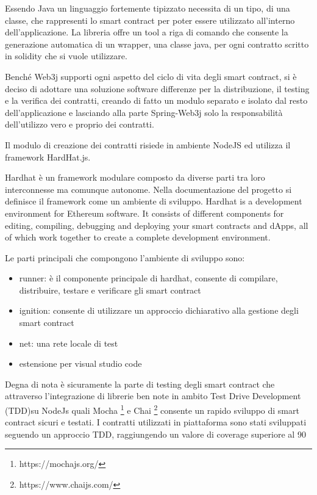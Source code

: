 \documentclass[a4paper,11pt]{article}
\begin{document}
Essendo Java un linguaggio fortemente tipizzato necessita di un tipo, di una classe, che rappresenti lo smart contract per poter essere utilizzato all'interno dell'applicazione. La libreria offre un tool a riga di comando che consente la generazione automatica di un wrapper, una classe java, per ogni contratto scritto in solidity che si vuole utilizzare.

Benché Web3j supporti ogni aspetto del ciclo di vita degli smart contract, si è deciso di adottare una soluzione software differenze per la distribuzione, il testing e la verifica dei contratti, creando di fatto un modulo separato e isolato dal resto dell'applicazione e lasciando alla parte Spring-Web3j solo la responsabilità dell'utilizzo vero e proprio dei contratti.

Il modulo di creazione dei contratti risiede in ambiente NodeJS ed utilizza il framework HardHat.js.

Hardhat è un framework modulare composto da diverse parti tra loro interconnesse ma comunque autonome. Nella documentazione del progetto si definisce il framework come un ambiente di sviluppo. Hardhat is a development environment for Ethereum software. It consists of different components for editing, compiling, debugging and deploying your smart contracts and dApps, all of which work together to create a complete development environment. \cite{hardhatGettingStarted}

Le parti principali che compongono l'ambiente di sviluppo sono:

\begin{itemize}
  \item runner: è il componente principale di hardhat, consente di compilare, distribuire, testare e verificare gli smart contract
  \item ignition: consente di utilizzare un approccio dichiarativo alla gestione degli smart contract
  \item net: una rete locale di test
  \item estensione per visual studio code
\end{itemize}

Degna di nota è sicuramente la parte di testing degli smart contract che attraverso l'integrazione di librerie ben note in ambito Test Drive Development (TDD)su NodeJs quali Mocha \footnote{https://mochajs.org/} e Chai \footnote{https://www.chaijs.com/} consente un rapido sviluppo di smart contract sicuri e testati.
I contratti utilizzati in piattaforma sono stati sviluppati seguendo un approccio TDD, raggiungendo un valore di coverage superiore al 90%
\end{document}
